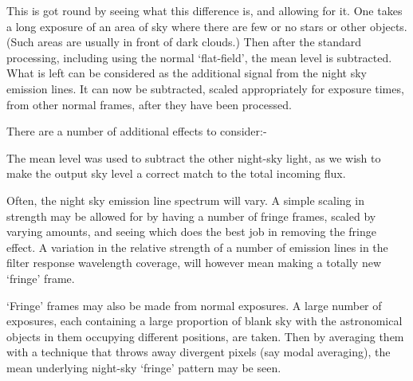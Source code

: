 \begin{small}
{{ This is got round by seeing what this difference is, and allowing for
 it. One takes a long exposure of an area of sky where there are few
 or no  stars or other objects. (Such areas are usually in front
 of dark clouds.) Then after the standard processing, including
 using the normal `flat-field', the mean level is subtracted. What
 is left can be considered as the additional signal from the night
 sky emission lines. It can now be subtracted, scaled appropriately
 for exposure times, from other normal frames, after they have been
 processed.

 There are a number of additional effects to consider:-

\begin{list}{{-}}{}
\item The mean level was used to subtract the other night-sky light,
    as we wish to make the output sky level a correct match to the
    total incoming flux.
\item Often, the night sky emission line spectrum will vary. A simple
    scaling in strength may be allowed for by having a number of
    fringe frames, scaled by varying amounts, and seeing which does
    the best job in removing the fringe effect. A variation in the
    relative strength of a number of emission lines in the filter
    response wavelength coverage, will however mean making a totally
    new `fringe' frame.
\item `Fringe' frames may also be made from normal exposures. A
    large number of exposures, each containing a large proportion
    of blank sky with the astronomical objects in them occupying
    different positions, are taken. Then by averaging them with a
    technique that throws away divergent pixels (say modal averaging),
    the mean underlying night-sky `fringe' pattern may be seen.
\end{list}



}}
\end{small}

